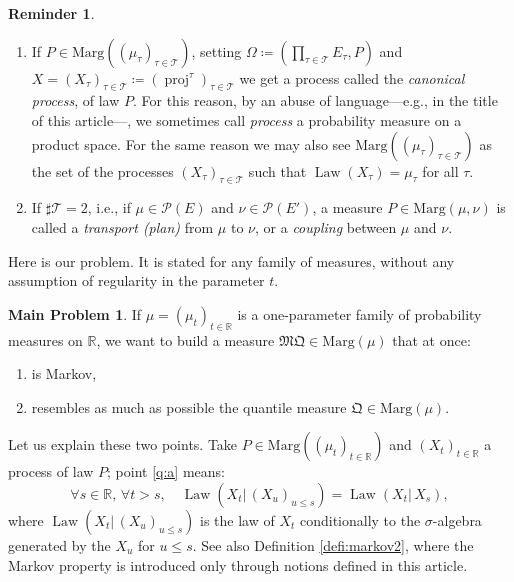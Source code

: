 \documentclass[11pt]{article}
\newcommand{\ie}{i.e.,\xspace}
\newcommand{\skpt}{\smallskip}
\theoremstyle{plain}
\theoremstyle{definition}
\newtheorem{reminder}[them]{Reminder}
\newtheorem*{problem*}{Main Problem}
\newcommand{\como}{\mathfrak{Q}}
\newcommand{\mq}{\mathfrak{MQ}}
\newcommand{\espace}{E}
\newcommand{\Tt}{{\mathcal T}}
\newcommand{\eqdef}{\coloneqq}
\newcommand{\eqdefup}{\coloneqq}
\newcommand{\p}{\mathcal{P}}
\newcommand{\ma}{\mathrm{Marg}}
\newcommand{\R}{\mathbb{R}}
\newcommand{\law}{\operatorname{Law}}
\newcommand{\pr}{\operatorname{proj}}
\begin{document}
\skpt
\begin{reminder}\label{remind:processus_canonique}
\begin{enumerate}
\item
\label{item:processus_canonique} If $P\in\ma((\mu_\tau)_{\tau\in\Tt})$, setting $\Omega\eqdefup(\prod_{\tau\in\Tt}E_\tau,P)$ and $X=(X_\tau)_{\tau\in \Tt}\eqdef(\pr^\tau)_{\tau\in \Tt}$ we get a process called the \emph{canonical process}, of law $P$. For this reason, by an abuse of language---e.g., in the title of this article---, we sometimes call \emph{process} a probability measure on a product space. For the same reason we may also see $\ma((\mu_\tau)_{\tau\in\Tt})$ as the set of the processes $(X_\tau)_{\tau\in\Tt}$ such that $\law(X_\tau)=\mu_\tau$ for all $\tau$.

\item
If $\sharp{\mathcal T}=2$, \ie if $\mu\in\p(\espace)$ and $\nu\in\p(\espace')$, a measure $P\in\ma(\mu,\nu)$ is called a \emph{transport (plan)} from $\mu$ to $\nu$, or a \emph{coupling} between $\mu$ and $\nu$.
\end{enumerate}
\end{reminder}

Here is our problem. It is stated for any family of measures, without any assumption of regularity in the parameter $t$.

\begin{problem*}\label{problem} If $\mu=(\mu_t)_{t\in\R}$ is a one-parameter family of probability measures on $\R$, we want to build a measure $\mq\in\ma(\mu)$ that at once:
\begin{enumerate}
\item\label{q:a}
is Markov,
\item\label{q:b}
resembles as much as possible the quantile measure $\como\in\ma(\mu)$.
\end{enumerate}
\end{problem*}

Let us explain these two points. Take $P\in\ma((\mu_t)_{t\in\R})$ and $(X_{t})_{t\in\R}$ a process of law $P$; point \eqref{q:a} means:
\begin{equation}\label{eq:def_markovien}
\forall s\in\R,\,\forall t>s,\quad \law(X_t|\,(X_{u})_{u\leqslant s})=\law(X_t|\,X_s),
\end{equation}
where $\law(X_t|\,(X_u)_{u\leq s})$ is the law of $X_t$ conditionally to the $\sigma$-algebra generated by the $X_u$ for $u\leq s$. See also Definition \ref{defi:markov2}, where the Markov property is introduced only through notions defined in this article.
\end{document}
